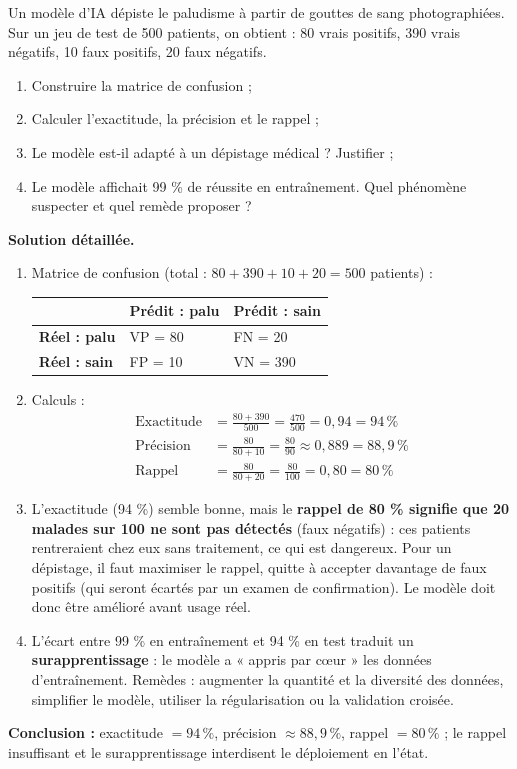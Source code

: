 \documentclass[11pt]{article}
\begin{document}
\begin{exoresolu}
Un modèle d'IA dépiste le paludisme à partir de gouttes de sang photographiées. Sur un jeu de test de 500 patients, on obtient : 80 vrais positifs, 390 vrais négatifs, 10 faux positifs, 20 faux négatifs.
\begin{enumerate}
\item Construire la matrice de confusion ;
\item Calculer l'exactitude, la précision et le rappel ;
\item Le modèle est-il adapté à un dépistage médical ? Justifier ;
\item Le modèle affichait 99 \% de réussite en entraînement. Quel phénomène suspecter et quel remède proposer ?
\end{enumerate}
\tcblower
\textbf{Solution détaillée.}
\begin{enumerate}
\item Matrice de confusion (total : $80+390+10+20 = 500$ patients) :
\begin{center}
\begin{tabularx}{\linewidth}{|l|X|X|}
\hline
\rowcolor{popblueL} & \textbf{Prédit : palu} & \textbf{Prédit : sain} \\
\hline
\textbf{Réel : palu} & VP = 80 & FN = 20 \\
\hline
\textbf{Réel : sain} & FP = 10 & VN = 390 \\
\hline
\end{tabularx}
\end{center}
\item Calculs :
\begin{align*}
\text{Exactitude} &= \frac{80 + 390}{500} = \frac{470}{500} = 0{,}94 = 94\,\% \\
\text{Précision} &= \frac{80}{80 + 10} = \frac{80}{90} \approx 0{,}889 = 88{,}9\,\% \\
\text{Rappel} &= \frac{80}{80 + 20} = \frac{80}{100} = 0{,}80 = 80\,\%
\end{align*}
\item L'exactitude (94 \%) semble bonne, mais le \textbf{rappel de 80 \% signifie que 20 malades sur 100 ne sont pas détectés} (faux négatifs) : ces patients rentreraient chez eux sans traitement, ce qui est dangereux. Pour un dépistage, il faut maximiser le rappel, quitte à accepter davantage de faux positifs (qui seront écartés par un examen de confirmation). Le modèle doit donc être amélioré avant usage réel.
\item L'écart entre 99 \% en entraînement et 94 \% en test traduit un \textbf{surapprentissage} : le modèle a « appris par cœur » les données d'entraînement. Remèdes : augmenter la quantité et la diversité des données, simplifier le modèle, utiliser la régularisation ou la validation croisée.
\end{enumerate}
\textbf{Conclusion :} exactitude $= 94\,\%$, précision $\approx 88{,}9\,\%$, rappel $= 80\,\%$ ; le rappel insuffisant et le surapprentissage interdisent le déploiement en l'état.
\end{exoresolu}
\end{document}
